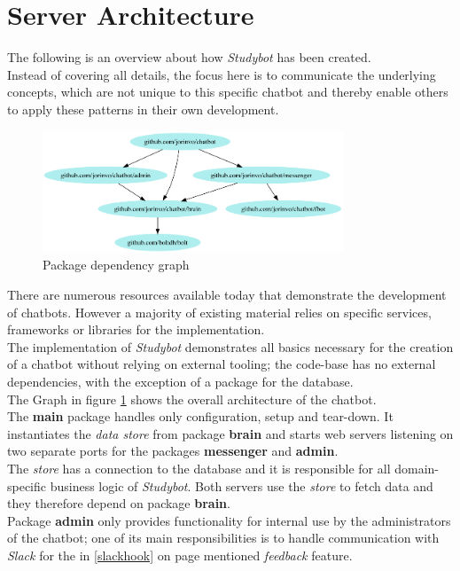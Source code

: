 \section{Server Architecture}


The following is an overview about how \emph{Studybot} has been created.
\\
Instead of covering all details, the focus here is to communicate the underlying concepts,
which are not unique to this specific chatbot and thereby enable others to apply these patterns in their own development.
\\

\begin{figure}[h]
  \centering
  \includegraphics[width=0.8\textwidth]{images/internal-deps.png}
  \caption{Package dependency graph\protect\footnotemark}
	\label{fig:internal-deps}
\end{figure}

There are numerous resources available today that demonstrate the development of chatbots.
However a majority of existing material relies on specific services, frameworks or libraries for the implementation.
\\
The implementation of \emph{Studybot} demonstrates all basics necessary for the creation of a chatbot
without relying on external tooling;
the code-base has no external dependencies, with the exception of a package for the database.
\\

The Graph in figure \ref{fig:internal-deps} shows the overall architecture of the chatbot.
\\
The \textbf{main} package handles only configuration, setup and tear-down.
It instantiates the \emph{data store} from package \textbf{brain}
and starts web servers listening on two separate ports for the packages \textbf{messenger} and \textbf{admin}.
\\

The \emph{store} has a connection to the database and it is responsible for all domain-specific business logic of \emph{Studybot}.
Both servers use the \emph{store} to fetch data and they therefore depend on package \textbf{brain}.
\\
Package \textbf{admin} only provides functionality for internal use by the administrators of the chatbot;
one of its main responsibilities is to handle communication with \emph{Slack}
for the in \ref{slackhook} on page \pageref{slackhook} mentioned \emph{feedback} feature.
\\

